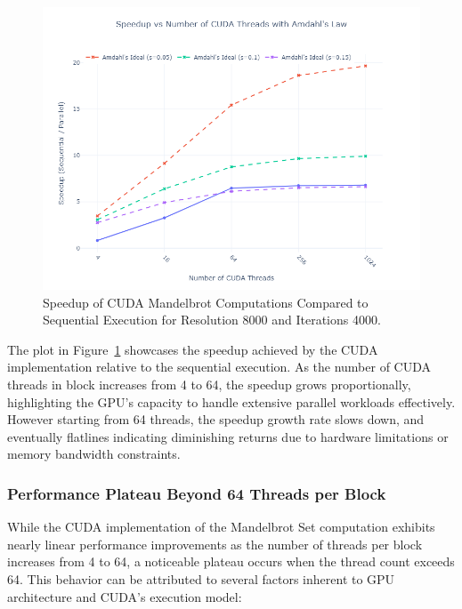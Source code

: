 \documentclass[
	report, %
	11pt, %
]{CSUniSchoolLabReport}
\newcounter{ct}
\begin{document}
\begin{figure}[H]
	\captionsetup{justification=centering, width=.8\linewidth}
	\centering
	\includegraphics[width=\textwidth]{./img/mandelbrot_cuda_speedup_vs_threads_amdahl.png}
	\caption{Speedup of CUDA Mandelbrot Computations Compared to Sequential Execution for Resolution 8000 and Iterations 4000.}
	\label{fig:mandelbrot_cuda_speedup_vs_threads_amdahl}
\end{figure}

The plot in Figure~\ref{fig:mandelbrot_cuda_speedup_vs_threads_amdahl} showcases the speedup achieved by the CUDA implementation relative to the sequential execution. As the number of CUDA threads in block increases from 4 to 64, the speedup grows proportionally, highlighting the GPU's capacity to handle extensive parallel workloads effectively. However starting from 64 threads, the speedup growth rate slows down, and eventually flatlines indicating diminishing returns due to hardware limitations or memory bandwidth constraints.

\subsubsection{Performance Plateau Beyond 64 Threads per Block}

While the CUDA implementation of the Mandelbrot Set computation exhibits nearly linear performance improvements as the number of threads per block increases from 4 to 64, a noticeable plateau occurs when the thread count exceeds 64. This behavior can be attributed to several factors inherent to GPU architecture and CUDA's execution model:
\end{document}
